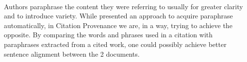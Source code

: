 \paragraph{}
Authors paraphrase the content they were referring to usually for greater clarity and to introduce variety. While \cite{shinyama2002automatic} presented an approach to acquire paraphrase automatically, in Citation Provenance we are, in a way, trying to achieve the opposite. By comparing the words and phrases used in a citation with paraphrases extracted from a cited work, one could possibly achieve better sentence alignment between the 2 documents.